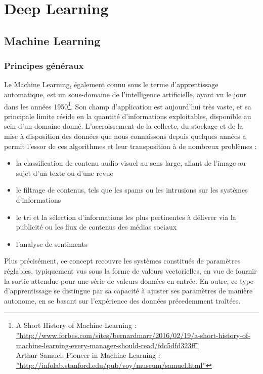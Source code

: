 \documentclass[a4paper,10pt]{report}
\title{}
\author{}
\begin{document}
\maketitle

\chapter{Deep Learning}


\section{Machine Learning}

\subsection{Principes généraux}

Le Machine Learning, également connu sous le terme d'apprentissage automatique, est un sous-domaine de l'intelligence artificielle, ayant vu le jour dans
les années 1950\footnote{
A Short History of Machine Learning :
  \hyperref[Mach_Learn_history]{''http://www.forbes.com/sites/bernardmarr/2016/02/19/a-short-history-of-machine-learning-every-manager-should-read/fdc5dfd323ff''}
   \\
   Arthur Samuel: Pioneer in Machine Learning :
   \hyperref[item]{''http://infolab.stanford.edu/pub/voy/museum/samuel.html''}}.
Son champ d'application est aujourd'hui très vaste, et sa principale limite réside en la quantité d'informations exploitables, disponible au sein d'un domaine donné.
L'accroissement de la collecte, du stockage et de la mise à disposition des données que nous connaissons depuis quelques années a permit l'essor de ces algorithmes et leur transposition à de nombreux problèmes :
\begin{itemize}
\item la classification de contenu audio-visuel au sens large, allant de l'image au sujet d'un texte ou d'une revue
\item le filtrage de contenus, tels que les spams ou les intrusions sur les systèmes d'informations
\item le tri et la sélection d'informations les plus pertinentes à délivrer via la publicité ou les flux de contenus des médias sociaux
\item l'analyse de sentiments
\end{itemize}

Plus précisément, ce concept recouvre les systèmes constitués de paramètres réglables, typiquement vus sous la forme de
valeurs vectorielles, en vue de fournir la sortie attendue pour une série de valeurs données en entrée. En outre, ce type d'apprentissage se distingue
par sa capacité à ajuster ses paramètres de manière autonome, en se basant sur l'expérience des données précedemment traîtées.
\end{document}
